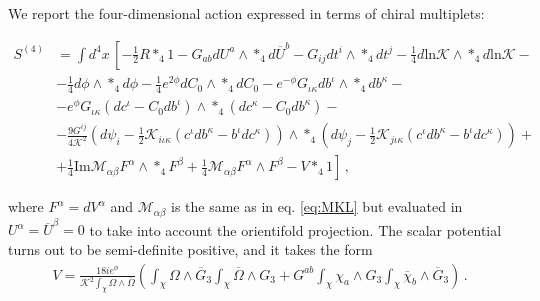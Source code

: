 \documentclass[12pt,a4paper]{book}
\begin{document}
We report the four-dimensional action expressed in terms of chiral multiplets:
\begin{small}
\begin{align}
\label{eq:FourDimensionalOrientifoldedAction}
S^{(4)} &= \int d^4x\, \left[-\frac{1}{2} R *_4 1 - G_{ab} dU^a \wedge *_4 d\overline{U}^b - G_{ij} dt^i \wedge *_4 dt^j - \frac{1}{4} d \text{ln} \mathcal{K} \wedge *_4 d \text{ln} \mathcal{K} - \right.& \nonumber \\
&- \frac{1}{4} d \phi \wedge *_4 d \phi - \frac{1}{4} e^{2 \phi} d C_0 \wedge *_4 dC_0 - e^{-\phi} G_{\iota \kappa} db^\iota \wedge *_4 d b^\kappa -& \nonumber \\
&- e^{\phi} G_{\iota \kappa} (dc^\iota - C_0 db^\iota) \wedge *_4 (dc^\kappa - C_0 db^\kappa) -& \nonumber \\
&- \frac{9 G^{ij}}{4 \mathcal{K}^2} \left(d \psi_i - \frac{1}{2} \mathcal{K}_{i \iota \kappa} (c^\iota db^\kappa - b^\iota dc^\kappa )\right) \wedge *_4 \left(d \psi_j - \frac{1}{2} \mathcal{K}_{j \iota \kappa} (c^\iota db^\kappa - b^\iota dc^\kappa)\right) +& \nonumber \\
&\left.+ \frac{1}{4} \text{Im} \mathcal{M}_{\alpha \beta} F^\alpha \wedge *_4 F^\beta + \frac{1}{4} \mathcal{M}_{\alpha \beta} F^\alpha \wedge F^\beta - V *_4 1 \right] \,,&
\end{align}
\end{small}
where $F^\alpha = dV^\alpha$ and $\mathcal{M}_{\alpha \beta}$ is the same as in eq. \eqref{eq:MKL} but evaluated in $U^\alpha = \overline{U}^\beta = 0$ to take into account the orientifold projection. The scalar potential turns out to be semi-definite positive, and it takes the form
\begin{align}
\label{eq:ScalarPotentialOrientifolded}
V = \frac{18i e^\phi}{\mathcal{K}^2 \int_\chi \Omega \wedge \overline{\Omega}} \left(\int_\chi \Omega \wedge \overline{G}_3\int_\chi \overline{\Omega} \wedge G_3 + G^{ab} \int_\chi \chi_a \wedge G_3 \int_\chi \overline{\chi}_b \wedge \overline{G}_3\right) \,.
\end{align}
\end{document}
